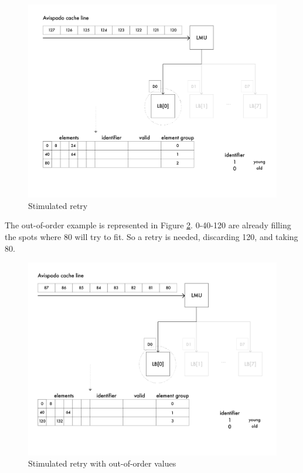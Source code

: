 \begin{figure}[H]
    \centering
    \includegraphics[scale = 0.5]{Chapter_2/img/cache-to-lb-ret-ex.png}
    \caption{Stimulated retry}
    \label{cache-to-lb-ret-ex}
\end{figure}


The out-of-order example is represented in Figure \ref{cache-to-lb-ooo-ret-ex}. 0-40-120 are already filling the spots where 80 will try to fit. So a retry is needed, discarding 120, and taking 80.

\begin{figure}[H]
    \centering
    \includegraphics[scale = 0.5]{Chapter_2/img/cache-to-lb-ooo-ret-ex.png}
    \caption{Stimulated retry with out-of-order values}
    \label{cache-to-lb-ooo-ret-ex}
\end{figure}



